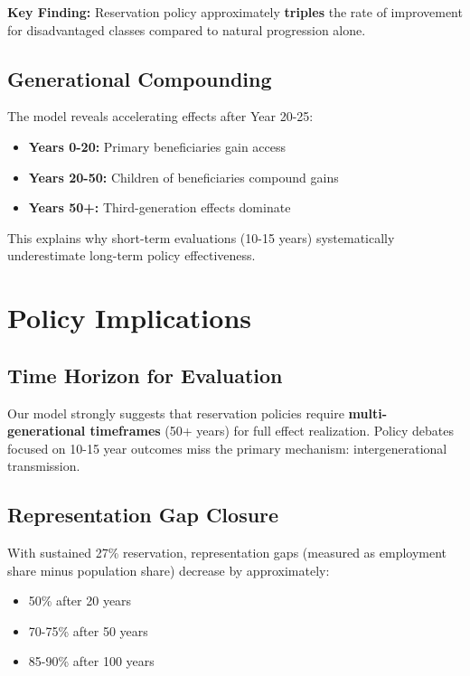 \documentclass[10pt,twocolumn]{article}
\begin{document}
\textbf{Key Finding:} Reservation policy approximately \textbf{triples} the rate of improvement for disadvantaged classes compared to natural progression alone.

\subsection{Generational Compounding}

The model reveals accelerating effects after Year 20-25:

\begin{itemize}
    \item \textbf{Years 0-20:} Primary beneficiaries gain access
    \item \textbf{Years 20-50:} Children of beneficiaries compound gains
    \item \textbf{Years 50+:} Third-generation effects dominate
\end{itemize}

This explains why short-term evaluations (10-15 years) systematically underestimate long-term policy effectiveness.

\section{Policy Implications}

\subsection{Time Horizon for Evaluation}

Our model strongly suggests that reservation policies require \textbf{multi-generational timeframes} (50+ years) for full effect realization. Policy debates focused on 10-15 year outcomes miss the primary mechanism: intergenerational transmission.

\subsection{Representation Gap Closure}

With sustained 27\% reservation, representation gaps (measured as employment share minus population share) decrease by approximately:
\begin{itemize}
    \item 50\% after 20 years
    \item 70-75\% after 50 years
    \item 85-90\% after 100 years
\end{itemize}
\end{document}
